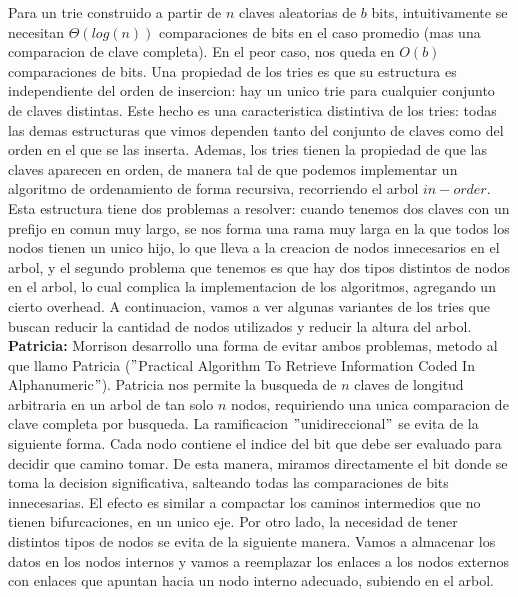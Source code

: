 \documentclass[10pt,a4paper]{article}
\begin{document}
\newline
\newline
Para un trie construido a partir de $n$ claves aleatorias de $b$ bits, intuitivamente se necesitan $\Theta(log(n))$ comparaciones de bits en el caso promedio (mas una comparacion de clave completa). En el peor caso, nos queda en $O(b)$ comparaciones de bits.
\newline
\newline
Una propiedad de los tries es que su estructura es independiente del orden de insercion: hay un unico trie para cualquier conjunto de claves distintas. Este hecho es una caracteristica distintiva de los tries: todas las demas estructuras que vimos dependen tanto del conjunto de claves como del orden en el que se las inserta. Ademas, los tries tienen la propiedad de que las claves aparecen en orden, de manera tal de que podemos implementar un algoritmo de ordenamiento de forma recursiva, recorriendo el arbol
$in-order$.
\newline
\newline
Esta estructura tiene dos problemas a resolver: cuando tenemos dos claves con un prefijo en comun muy largo, se nos forma una rama muy larga en la que todos los nodos tienen un unico hijo, lo que lleva a la creacion de nodos innecesarios en el arbol, y el segundo problema que tenemos es que hay dos tipos distintos de nodos en el arbol, lo cual complica la implementacion de los algoritmos, agregando un cierto overhead. A continuacion, vamos a ver algunas variantes de los tries que buscan reducir la cantidad de nodos utilizados y reducir la altura del arbol.
\newline
\newline
\textbf{Patricia:} Morrison desarrollo una forma de evitar ambos problemas, metodo al que llamo Patricia ($"$Practical Algorithm To Retrieve Information Coded In Alphanumeric$"$). Patricia nos permite la busqueda de $n$ claves de longitud arbitraria en un arbol de tan solo $n$ nodos, requiriendo una unica comparacion de clave completa por busqueda. La ramificacion $"$unidireccional$"$ se evita de la siguiente forma. Cada nodo contiene el indice del bit que debe ser evaluado para decidir que camino tomar. De esta manera, miramos directamente el bit donde se toma la decision significativa, salteando todas las comparaciones de bits innecesarias. El efecto es similar a compactar los caminos intermedios que no tienen bifurcaciones, en un unico eje. Por otro lado, la necesidad de tener distintos tipos de nodos se evita de la siguiente manera. Vamos a almacenar los datos en los nodos internos y vamos a reemplazar los enlaces a los nodos externos con enlaces que
apuntan hacia un nodo interno adecuado, subiendo en el arbol.
\newpage
\end{document}
